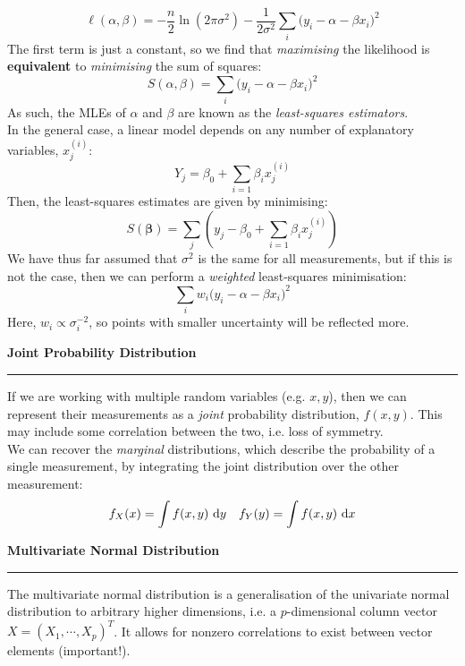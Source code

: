 \documentclass[12pt]{article}
\newcommand{\minisection}[1]{
    \par\vspace{0.25cm}
    \textbf{#1}\par
    \vspace{0.1cm}
    \hrule
    \vspace{0.25cm}
}
\begin{document}
    \begin{equation*}
        \ell(\alpha,\beta) = -\frac n2\ln(2\pi\sigma^2) - \frac{1}{2\sigma^2}\sum_i\big( y_i-\alpha-\beta x_i\big)^2
    \end{equation*}
    The first term is just a constant, so we find that \textit{maximising} the likelihood is \textbf{equivalent} to \textit{minimising} the sum of squares:
    \begin{equation*}
        S(\alpha,\beta) = \sum_i\big( y_i - \alpha - \beta x_i \big)^2
    \end{equation*}
    As such, the MLEs of $\alpha$ and $\beta$ are known as the \textit{least-squares estimators}.\\
    In the general case, a linear model depends on any number of explanatory variables, $x^{(i)}_j$:
    \begin{equation*}
        Y_j = \beta_0 + \sum_{i=1} \beta_ix_j^{(i)}
    \end{equation*}
    Then, the least-squares estimates are given by minimising:
    \begin{equation*}
        S(\bm\beta) = \sum_{j}\left( y_j - \beta_0 + \sum_{i=1}\beta_i x_j^{(i)}\right)
    \end{equation*}
    We have thus far assumed that $\sigma^2$ is the same for all measurements, but if this is not the case, then we can perform a \textit{weighted} least-squares minimisation:
    \begin{equation*}
        \sum_i w_i\big(y_i - \alpha - \beta x_i\big)^2
    \end{equation*}
    Here, $w_i\propto \sigma_i^{-2}$, so points with smaller uncertainty will be reflected more. 
    \minisection{Joint Probability Distribution}
    If we are working with multiple random variables (e.g. $x,y$), then we can represent their measurements as a \textit{joint} probability distribution, $f(x,y)$. This may include some correlation between the two, i.e. loss of symmetry.\\
    We can recover the \textit{marginal} distributions, which describe the probability of a single measurement, by integrating the joint distribution over the other measurement:
    \begin{align*}
        f_X(x) = \int f(x,y)\ \text dy && f_Y(y) = \int f(x,y)\ \text dx
    \end{align*}
    \minisection{Multivariate Normal Distribution}
    The multivariate normal distribution is a generalisation of the univariate normal distribution to arbitrary higher dimensions, i.e. a $p$-dimensional column vector $X=(X_1,\cdots,X_p)^T$. It allows for nonzero correlations to exist between vector elements (important!).\\
\end{document}
